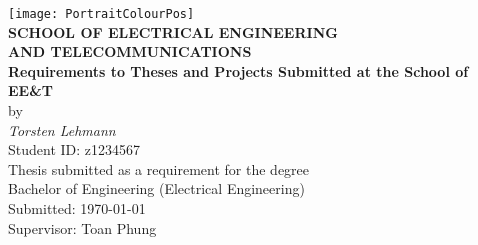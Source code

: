 \begin{center}
\texttt{[image: PortraitColourPos]}\\[0.5cm]
\textbf{\large SCHOOL OF ELECTRICAL ENGINEERING\\
AND TELECOMMUNICATIONS}\\[2cm]
{\addtolength{\baselineskip}{0.5cm}
\textbf{\Huge
Requirements to Theses and Projects Submitted at the School of EE\&T} \\[0.5cm]
}
{\Large by}\\[0.5cm]
\textit{\huge
Torsten Lehmann}\\[0.5cm]
{\Large
Student ID: z1234567}\\[1.5cm]
{\Large
Thesis submitted as a requirement for the degree\\
Bachelor of Engineering (Electrical Engineering)\\[2ex]
\vfill
Submitted: \today\\
Supervisor: Toan Phung
\vspace*{-1cm}
}
\end{center}


